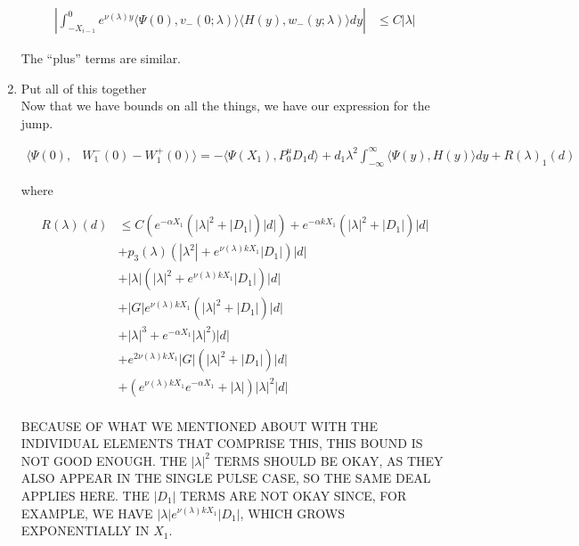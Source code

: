 \documentclass[12pt]{article}
\begin{document}
\begin{enumerate}
\begin{align*}
\left| \int_{-X_{i-1}}^0 e^{\nu(\lambda)y} \langle \Psi(0), v_-(0; \lambda) \rangle
\langle H(y), w_-(y; \lambda) \rangle dy \right| 
&\leq C |\lambda| 
\end{align*}

The ``plus'' terms are similar.

\item Put all of this together\\

Now that we have bounds on all the things, we have our expression for the jump.

\begin{align*}
\langle \Psi(0), &W_1^-(0) - W_1^+(0) \rangle = 
-\langle \Psi(X_1), P^u_0 D_1 d \rangle + d_1 \lambda^2 \int_{-\infty}^\infty \langle \Psi(y), H(y) \rangle dy + R(\lambda)_1(d)
\end{align*}

where

\begin{align*}
R(\lambda)(d) &\leq C( e^{-\alpha X_1}( |\lambda|^2 + |D_1|)|d|) + e^{-\alpha k X_1} ( |\lambda|^2 + |D_1|) |d| \\
&+ p_3(\lambda) (|\lambda^2| + e^{\nu(\lambda)k X_1}|D_1|)|d| \\
&+ |\lambda| (|\lambda|^2 + e^{\nu(\lambda)k X_1} |D_1|)|d| \\
&+ |G| e^{\nu(\lambda)k X_1} ( |\lambda|^2 + |D_1| )|d| \\ 
&+ |\lambda|^3 + e^{-\alpha X_1} |\lambda|^2 )|d| \\
&+ e^{2 \nu(\lambda) k X_1} |G| ( |\lambda|^2 + |D_1| )|d| \\
&+ (e^{\nu(\lambda)k X_1} e^{-\alpha X_1} + |\lambda|)|\lambda|^2|d|\\
\end{align*}

BECAUSE OF WHAT WE MENTIONED ABOUT WITH THE INDIVIDUAL ELEMENTS THAT COMPRISE THIS, THIS BOUND IS NOT GOOD ENOUGH. THE $|\lambda|^2$ TERMS SHOULD BE OKAY, AS THEY ALSO APPEAR IN THE SINGLE PULSE CASE, SO THE SAME DEAL APPLIES HERE. THE $|D_1|$ TERMS ARE NOT OKAY SINCE, FOR EXAMPLE, WE HAVE $|\lambda| e^{\nu(\lambda)k X_1} |D_1|$, WHICH GROWS EXPONENTIALLY IN $X_1$.

\end{enumerate}
\end{document}
